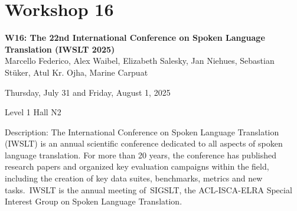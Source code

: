 \clearpage



\section[W16: The 22nd International Conference on Spoken Language Translation (IWSLT 2025)]{Workshop 16}
\label{workshop_16}

\begin{center}
    {\Large \textbf{W16: The 22nd International Conference on Spoken Language Translation (IWSLT 2025)}}\\
    

   Marcello Federico, Alex Waibel, Elizabeth Salesky, Jan Niehues, Sebastian Stüker, Atul Kr. Ojha, Marine Carpuat
    
    Thursday, July 31 and Friday, August 1, 2025
    
    Level 1 Hall N2

\end{center}

Description: The International Conference on Spoken Language Translation (IWSLT) is an annual scientific conference dedicated to all aspects of spoken language translation. For more than 20 years, the conference has published research papers and organized key evaluation campaigns within the field, including the creation of key data suites, benchmarks, metrics and new tasks. IWSLT is the annual meeting of SIGSLT, the ACL-ISCA-ELRA Special Interest Group on Spoken Language Translation.

